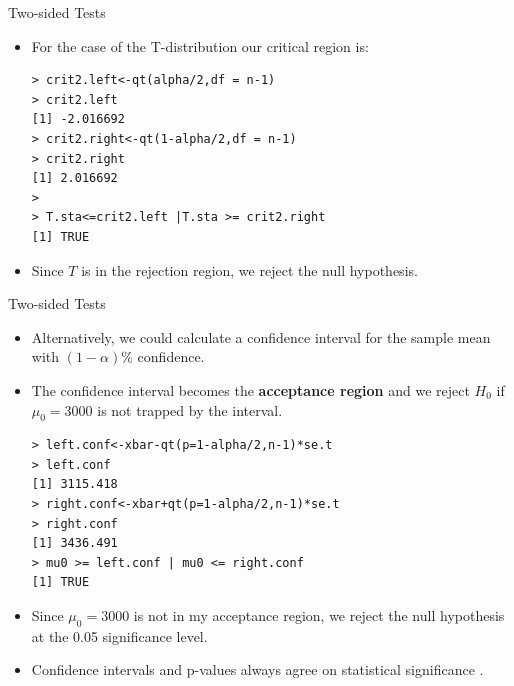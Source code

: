 \documentclass[handout]{beamer}
\begin{document}
\begin{frame}[fragile]{Two-sided Tests}
\scriptsize{
\begin{itemize}

\item For the case of the T-distribution our critical region is:
\begin{verbatim}
> crit2.left<-qt(alpha/2,df = n-1)
> crit2.left
[1] -2.016692
> crit2.right<-qt(1-alpha/2,df = n-1)
> crit2.right
[1] 2.016692
> 
> T.sta<=crit2.left |T.sta >= crit2.right
[1] TRUE
\end{verbatim}
\item Since $T$ is in the rejection region, we reject the null hypothesis.

\end{itemize}



} 
\end{frame}

\begin{frame}[fragile]{Two-sided Tests}
\scriptsize{
\begin{itemize}

\item Alternatively, we could calculate a confidence interval for the sample mean  with $(1-\alpha)\%$ confidence.

\item The confidence interval becomes the \textbf{acceptance region} and we reject $H_0$ if $\mu_0 =3000$ is not trapped by the interval.

\begin{verbatim}
> left.conf<-xbar-qt(p=1-alpha/2,n-1)*se.t
> left.conf
[1] 3115.418
> right.conf<-xbar+qt(p=1-alpha/2,n-1)*se.t
> right.conf
[1] 3436.491
> mu0 >= left.conf | mu0 <= right.conf
[1] TRUE
\end{verbatim}

\item Since  $\mu_0 =3000$ is not in my acceptance region, we reject the null hypothesis at the 0.05 significance level.

\item Confidence intervals and p-values always agree on statistical significance \cite{minitab_conf}. 

\end{itemize}



} 
\end{frame}
\end{document}
